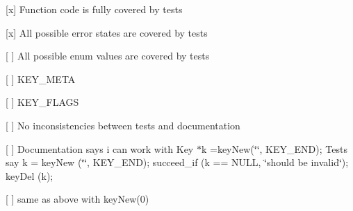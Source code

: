\begin{DoxyItemize}
\item \mbox{[}x\mbox{]} Function code is fully covered by tests
\item \mbox{[}x\mbox{]} All possible error states are covered by tests
\item \mbox{[} \mbox{]} All possible enum values are covered by tests
\begin{DoxyItemize}
\item \mbox{[} \mbox{]} K\+E\+Y\+\_\+\+M\+E\+TA
\item \mbox{[} \mbox{]} K\+E\+Y\+\_\+\+F\+L\+A\+GS
\end{DoxyItemize}
\item \mbox{[} \mbox{]} No inconsistencies between tests and documentation
\begin{DoxyItemize}
\item \mbox{[} \mbox{]} Documentation says i can work with {\ttfamily Key $\ast$k =key\+New(\char`\"{}\char`\"{}, K\+E\+Y\+\_\+\+E\+ND);} Tests say {\ttfamily k = key\+New (\char`\"{}\char`\"{}, K\+E\+Y\+\_\+\+E\+ND); succeed\+\_\+if (k == N\+U\+LL, \char`\"{}should be invalid\char`\"{}); key\+Del (k);}
\item \mbox{[} \mbox{]} same as above with {\ttfamily key\+New(0)}
\end{DoxyItemize}
\end{DoxyItemize}
